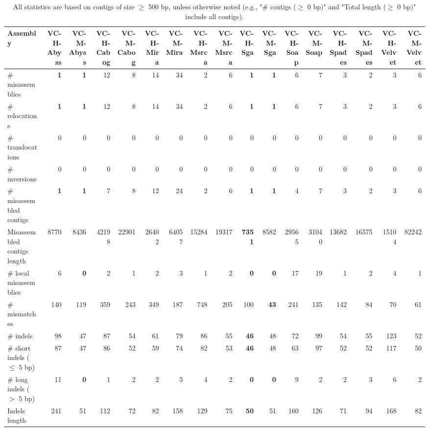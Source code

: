 \documentclass[12pt,a4paper]{article}
\begin{document}
\begin{table}[ht]
\begin{center}
\caption{All statistics are based on contigs of size $\geq$ 500 bp, unless otherwise noted (e.g., "\# contigs ($\geq$ 0 bp)" and "Total length ($\geq$ 0 bp)" include all contigs).}
\begin{tabular}{|l*{16}{|r}|}
\hline
Assembly & VC-H-Abyss & VC-M-Abyss & VC-H-Cabog & VC-M-Cabog & VC-H-Mira & VC-M-Mira & VC-H-Msrca & VC-M-Msrca & VC-H-Sga & VC-M-Sga & VC-H-Soap & VC-M-Soap & VC-H-Spades & VC-M-Spades & VC-H-Velvet & VC-M-Velvet \\ \hline
\# misassemblies & {\bf 1} & {\bf 1} & 12 & 8 & 14 & 34 & 2 & 6 & {\bf 1} & {\bf 1} & 6 & 7 & 3 & 2 & 3 & 6 \\ \hline
\hspace{5mm}\# relocations & {\bf 1} & {\bf 1} & 12 & 8 & 14 & 34 & 2 & 6 & {\bf 1} & {\bf 1} & 6 & 7 & 3 & 2 & 3 & 6 \\ \hline
\hspace{5mm}\# translocations & 0 & 0 & 0 & 0 & 0 & 0 & 0 & 0 & 0 & 0 & 0 & 0 & 0 & 0 & 0 & 0 \\ \hline
\hspace{5mm}\# inversions & 0 & 0 & 0 & 0 & 0 & 0 & 0 & 0 & 0 & 0 & 0 & 0 & 0 & 0 & 0 & 0 \\ \hline
\# misassembled contigs & {\bf 1} & {\bf 1} & 7 & 8 & 12 & 24 & 2 & 6 & {\bf 1} & {\bf 1} & 4 & 7 & 3 & 2 & 3 & 6 \\ \hline
Misassembled contigs length & 8770 & 8436 & 42198 & 22901 & 26402 & 64057 & 15284 & 19317 & {\bf 7351} & 8582 & 29565 & 31040 & 13682 & 16575 & 15104 & 82242 \\ \hline
\# local misassemblies & 6 & {\bf 0} & 2 & 1 & 2 & 3 & 1 & 2 & {\bf 0} & {\bf 0} & 17 & 19 & 1 & 2 & 4 & 1 \\ \hline
\# mismatches & 140 & 119 & 359 & 243 & 349 & 187 & 748 & 205 & 100 & {\bf 43} & 241 & 135 & 142 & 84 & 70 & 61 \\ \hline
\# indels & 98 & 47 & 87 & 54 & 61 & 79 & 86 & 55 & {\bf 46} & 48 & 72 & 99 & 54 & 55 & 123 & 52 \\ \hline
\hspace{5mm}\# short indels ($\leq$ 5 bp) & 87 & 47 & 86 & 52 & 59 & 74 & 82 & 53 & {\bf 46} & 48 & 63 & 97 & 52 & 52 & 117 & 50 \\ \hline
\hspace{5mm}\# long indels ($>$ 5 bp) & 11 & {\bf 0} & 1 & 2 & 2 & 5 & 4 & 2 & {\bf 0} & {\bf 0} & 9 & 2 & 2 & 3 & 6 & 2 \\ \hline
Indels length & 241 & 51 & 112 & 72 & 82 & 158 & 129 & 75 & {\bf 50} & 51 & 160 & 126 & 71 & 94 & 168 & 82 \\ \hline
\end{tabular}
\end{center}
\end{table}
\end{document}
